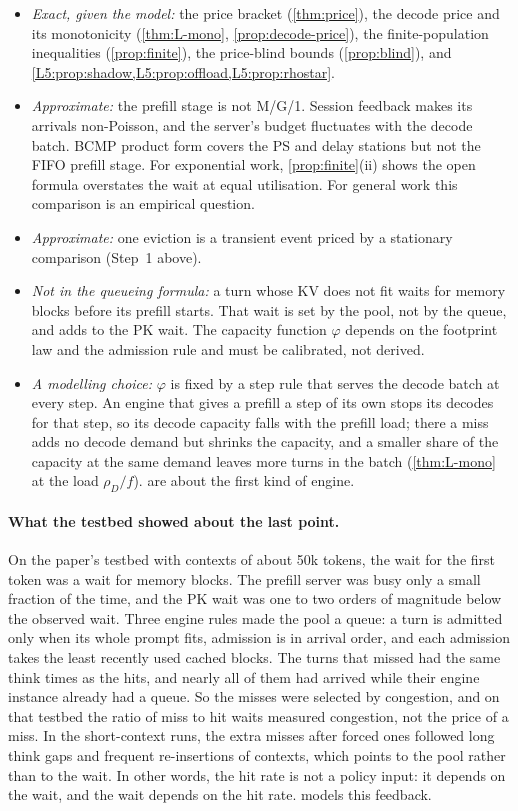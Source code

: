 \begin{itemize}
\item \emph{Exact, given the model:} the price bracket (\cref{thm:price}),
  the decode price and its monotonicity (\cref{thm:L-mono},
  \cref{prop:decode-price}), the finite-population inequalities
  (\cref{prop:finite}), the price-blind bounds (\cref{prop:blind}), and
  \cref{L5:prop:shadow,L5:prop:offload,L5:prop:rhostar}.
\item \emph{Approximate:} the prefill stage is not M/G/1. Session feedback
  makes its arrivals non-Poisson, and the server's budget fluctuates with
  the decode batch. BCMP product form covers the PS and delay stations but
  not the FIFO prefill stage. For exponential work,
  \cref{prop:finite}(ii) shows the open formula overstates the wait at
  equal utilisation. For general work this comparison is an empirical
  question.
\item \emph{Approximate:} one eviction is a transient event priced by a
  stationary comparison (Step~1 above).
\item \emph{Not in the queueing formula:} a turn whose KV does not fit
  waits for memory blocks before its prefill starts. That wait is set by
  the pool, not by the queue, and adds to the PK wait. The capacity
  function $\varphi$ depends on the footprint law and the admission rule
  and must be calibrated, not derived.
\item \emph{A modelling choice:} $\varphi$ is fixed by a step rule that
  serves the decode batch at every step. An engine that gives a prefill a
  step of its own stops its decodes for that step, so its decode capacity
  falls with the prefill load; there a miss adds no decode demand but
  shrinks the capacity, and a smaller share of the capacity at the same
  demand leaves more turns in the batch (\cref{thm:L-mono} at the load
  $\rho_D/f$).  are about the
  first kind of engine.
\end{itemize}

\paragraph{What the testbed showed about the last point.} On the paper's testbed with
contexts of about 50k tokens, the wait for the first token was a wait for memory
blocks. The prefill server was busy only a small fraction of the time, and the PK wait
was one to two orders of magnitude below the observed wait. Three engine rules made the
pool a queue: a turn is admitted only when its whole prompt fits, admission is in
arrival order, and each admission takes the least recently used cached blocks. The
turns that missed had the same think times as the hits, and nearly all of them had
arrived while their engine instance already had a queue. So the misses were selected
by congestion, and on that testbed the ratio of miss to hit waits measured congestion,
not the price of a miss. In the short-context runs, the extra misses after forced ones
followed long think gaps and frequent re-insertions of contexts, which points to the
pool rather than to the wait. In other words, the hit rate is not a policy input: it depends on the wait,
and the wait depends on the hit rate.  models this feedback.

